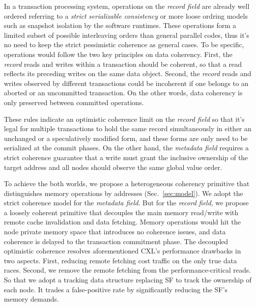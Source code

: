 \ifx{}\stale
In a transaction processing system, operations on the \textit{record field} are already well ordered referring to a \textit{strict serializable consistency} or more loose ordring models such as snapshot isolation by the software runtimes. 
These operations form a limited subset of possible interleaving orders than general parallel codes, thus it's no need to keep the strict pessimistic coherence as general cases. 
To be specific, operations would follow the two key principles on data coherency. 
First, the \textit{record} reads and writes within a transaction should be coherent, so that a read reflects its preceding writes on the same data object. 
Second, the \textit{record} reads and writes observed by different transactions could be incoherent if one belongs to an aborted or an uncommitted transaction. On the other words, data coherency is only preserved between committed operations. 


These rules indicate an optimistic coherence limit on the \textit{record field} so that it's legal for multiple transactions to hold the same record simultaneously in either an unchanged or a speculatively modified form, and these forms are only need to be serialized at the commit phases. On the other hand, the \textit{metadata field} requires a strict coherence guarantee that a write must grant the inclusive ownership of 
the target address and all nodes should observe the same global value order. 

To achieve the both worlds, we propose a heterogeneous coherency primitive that distinguishes memory operations by addresses (Sec.~\ref{sec:model}).
We adopt the strict coherence model for the \textit{metadata field}. But for the \textit{record field}, we propose a loosely coherent primitive that decouples the main memory read/write with remote cache invalidation and data fetching. Memory operations would hit the node private memory space that introduces no coherence issues, and data coherence is delayed to the transaction commitment phase. The decoupled optimistic coherence resolves aforementioned CXL's performance drawbacks in two aspects. 
First, reducing remote fetching cost traffic on the only true data races. 
Second, we remove the remote fetching from the performance-critical reads. So that we adopt a tracking data structure replacing SF to track the ownership of each node. It trades a false-positive rate by significantly reducing the SF's memory demands. 
\fi



